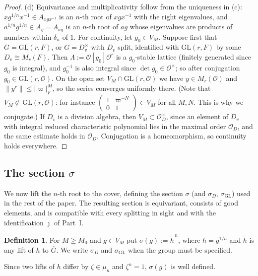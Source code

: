 \documentclass[12pt]{article}
\newcommand{\ov}[1]{\overline{#1}}
\newcommand{\cO}{\mathcal{O}}
\newcommand{\GL}{\mathrm{GL}}
\newcommand{\Gb}{\ov{G}}
\newcommand{\jj}{\jmath}
\newcommand{\sg}{\sigma}
\theoremstyle{plain}
\theoremstyle{definition}
\newtheorem{definition}[theorem]{Definition}
\begin{document}
\begin{proof}
(d) Equivariance and multiplicativity follow from the uniqueness in (c): $xg^{1/n}x^{-1}\in A_{xgx^{-1}}$ is an $n$-th root of $xgx^{-1}$ with the right eigenvalues, and $a^{1/n}g^{1/n}\in A_g=A_{ag}$ is an $n$-th root of $ag$ whose eigenvalues are products of numbers within $\delta_n$ of $1$. For continuity, let $g_0\in V_M$. Suppose first that $G=\GL(r,F)$, or $G=D_v^\times$ with $D_v$ split, identified with $\GL(r,F)$ by some $D_v\cong M_r(F)$. Then $\Lambda:=\cO[g_0]\cO^r$ is a $g_0$-stable lattice (finitely generated since $g_0$ is integral), and $g_0^{-1}$ is also integral since $\det g_0\in\cO^\times$; so after conjugation $g_0\in\GL(r,\cO)$. On the open set $V_M\cap\GL(r,\cO)$ we have $y\in M_r(\cO)$ and $\|y^r\|\le|\varpi|_F^M$, so the series converges uniformly there. (Note that $V_M\not\subset\GL(r,\cO)$: for instance $\left(\begin{smallmatrix}1&\varpi^{-N}\\0&1\end{smallmatrix}\right)\in V_M$ for all $M,N$. This is why we conjugate.) If $D_v$ is a division algebra, then $V_M\subset\cO_D^\times$, since an element of $D_v$ with integral reduced characteristic polynomial lies in the maximal order $\cO_D$, and the same estimate holds in $\cO_D$. Conjugation is a homeomorphism, so continuity holds everywhere.
\end{proof}


\subsection{The section $\sg$}\label{subsec:section}
We now lift the $n$-th root to the cover, defining the section $\sg$ (and $\sg_D$, $\sg_{\GL}$) used in the rest of the paper. The resulting section is equivariant, consists of good elements, and is compatible with every splitting in sight and with the identification $\jj$ of Part~I.

\begin{definition}
For $M\ge M_0$ and $g\in V_M$ put $\sg(g):=\tilde h^{\,n}$, where $h=g^{1/n}$ and $\tilde h$ is any lift of $h$ to $\Gb$. We write $\sg_D$ and $\sg_{\GL}$ when the group must be specified.
\end{definition}

Since two lifts of $h$ differ by $\zeta\in\mu_n$ and $\zeta^n=1$, $\sg(g)$ is well defined.
\end{document}
